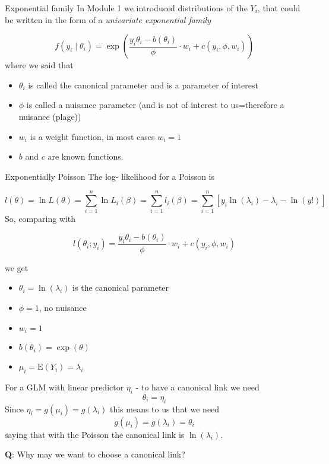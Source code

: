 \documentclass[
  ignorenonframetext,
]{beamer}
\providecommand{\tightlist}{%
  \setlength{\itemsep}{0pt}\setlength{\parskip}{0pt}}
\begin{document}
\begin{frame}
\begin{block}{Exponential family}
\label{exponential-family}
In Module 1 we introduced distributions of the \(Y_i\), that could be
written in the form of a \emph{univariate exponential family}

\[ 
f(y_i\mid \theta_i)=\exp \left( \frac{y_i \theta_i-b(\theta_i)}{\phi}\cdot w_i + c(y_i, \phi, w_i) \right)
\] where we said that

\begin{itemize}
\tightlist
\item
  \(\theta_i\) is called the canonical parameter and is a parameter of
  interest
\item
  \(\phi\) is called a nuisance parameter (and is not of interest to
  us=therefore a nuisance (plage))
\item
  \(w_i\) is a weight function, in most cases \(w_i=1\)
\item
  \(b\) and \(c\) are known functions.
\end{itemize}
\end{block}
\end{frame}

\begin{frame}
\begin{block}{Exponentially Poisson}
\label{exponentially-poisson}
The log- likelihood for a Poisson is

\[l(\theta)=\ln L(\theta)=\sum_{i=1}^n \ln L_i(\beta)=\sum_{i=1}^n l_i(\beta)=\sum_{i=1}^n [y_i \ln(\lambda_i)-\lambda_i-\ln(y!)]\]
So, comparing with

\[ 
l(\theta_i; y_i)=\frac{y_i \theta_i-b(\theta_i)}{\phi}\cdot w_i + c(y_i, \phi, w_i)
\]

we get

\begin{itemize}
\tightlist
\item
  \(\theta_i=\ln(\lambda_i)\) is the canonical parameter
\item
  \(\phi=1\), no nuisance
\item
  \(w_i=1\)
\item
  \(b(\theta_i)=\exp(\theta)\)
\item
  \(\mu_i=\text{E}(Y_i)=\lambda_i\)
\end{itemize}
\end{block}
\end{frame}

\begin{frame}
For a GLM with linear predictor \(\eta_i\) - to have a canonical link we
need \[\theta_i=\eta_i\] Since \(\eta_i=g(\mu_i)=g(\lambda_i)\) this
means to us that we need \[ g(\mu_i)=g(\lambda_i)=\theta_i\] saying that
with the Poisson the canonical link is \(\ln(\lambda_i)\).

\textbf{Q}: Why may we want to choose a canonical link?
\end{frame}
\end{document}

